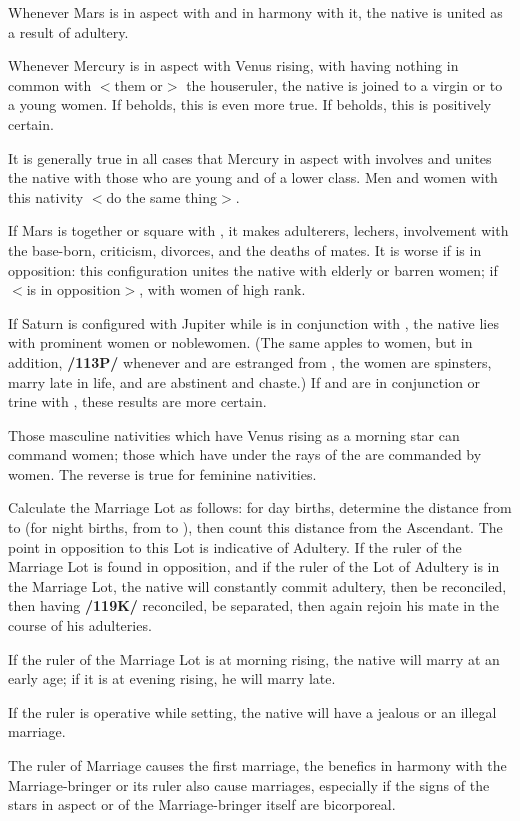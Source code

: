 Whenever Mars is in aspect with \Venus\xspace and in harmony with it, the native is united as a result of adultery. 

Whenever Mercury is in aspect with Venus rising, with \Saturn\xspace having nothing in common with $<$them or$>$ the houseruler, the native is joined to a virgin or to a young women. If \Mars\xspace beholds, this is even more true. If \Jupiter\xspace beholds, this is positively certain. 

It is generally true in all cases that Mercury in aspect with \Venus\xspace involves and unites the native with those who are young and of a lower class. Men and women with this nativity $<$do the same thing$>$. 

If Mars is together or square with \Venus, it makes
adulterers, lechers, involvement with the base-born, criticism, divorces, and the deaths of mates. It is worse if \Saturn\xspace is in opposition: this configuration unites the native with elderly or barren women; if \Jupiter\xspace $<$is in opposition$>$, with women of high rank. 

If Saturn is configured with Jupiter while \Jupiter\xspace is in conjunction with \Venus, the native lies with prominent women or noblewomen. (The same apples to
women, but in addition, \textbf{/113P/} whenever \Mars\xspace and \Mercury\xspace are estranged from \Venus, the women are
spinsters, marry late in life, and are abstinent and chaste.) 
If \Saturn\xspace and \Jupiter\xspace are in conjunction or trine with \Venus, these results are more certain. 

Those masculine nativities which have Venus rising as a morning star can command women; those which have \Venus\xspace under the rays of the \Sun\xspace are commanded by women. The reverse is true for feminine nativities.

Calculate the Marriage Lot as follows: for day births, determine the distance from \Jupiter\xspace to \Venus\xspace (for night births, from \Venus\xspace to \Jupiter), then count this distance from the Ascendant. The point in opposition to this Lot is indicative of Adultery. If the ruler of the Marriage Lot is found in opposition, and if the ruler of the Lot of Adultery is in the Marriage Lot, the native will constantly commit adultery, then be reconciled, then having \textbf{/119K/} reconciled, be separated, then again rejoin his mate in the course of his adulteries. 

If the ruler of the Marriage Lot is at morning rising, the native will marry at an early age; if it is at evening rising, he will marry late. 

If the ruler is operative while setting, the native will have a jealous or an illegal marriage. 

The ruler of Marriage causes the first marriage, the benefics in harmony with the Marriage-bringer or its ruler also cause marriages, especially if the signs of the stars in aspect or of the Marriage-bringer itself are bicorporeal.


\newpage
